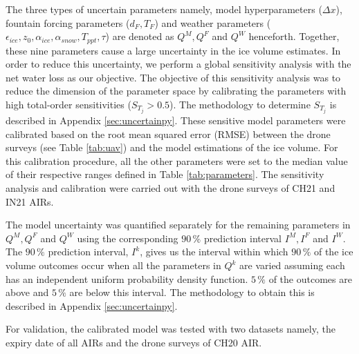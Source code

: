\documentclass[utf8]{frontiersSCNS}
\begin{document}
The three types of uncertain parameters namely, model hyperparameters ($\Delta x$), fountain forcing parameters
($d_F, T_F$) and weather parameters ($\epsilon_{ice}, z_0, \alpha_{ice}, \alpha_{snow}, T_{ppt}, \tau$) are
denoted as $Q^M, Q^F$ and $Q^W$ henceforth. Together, these nine parameters cause a large uncertainty in the ice
volume estimates. In order to reduce this uncertainty, we perform a global sensitivity analysis with the net
water loss as our objective. The objective of this sensitivity analysis was to reduce the dimension of the
parameter space by calibrating the parameters with high total-order sensitivities ($S_{T_{j}} > 0.5$). The
methodology to determine $S_{T_{j}}$ is described in Appendix \ref{sec:uncertainpy}. These sensitive model
parameters were calibrated based on the root mean squared error (RMSE) between the drone surveys (see Table
\ref{tab:uav}) and the model estimations of the ice volume. For this calibration procedure, all the other
parameters were set to the median value of their respective ranges defined in Table \ref{tab:parameters}.  The
sensitivity analysis and calibration were carried out with the drone surveys of CH21 and IN21 AIRs. 

The model uncertainty was quantified separately for the remaining parameters in $Q^M, Q^F$ and $Q^W$ using the
corresponding $90\, \%$ prediction interval $I^M, I^F$ and $I^W$. The $90\, \%$ prediction interval, $I^k$, gives us the
interval within which $90\,\%$ of the ice volume outcomes occur when all the parameters in $Q^k$ are varied
assuming each has an independent uniform probability density function. $5\,\%$ of the outcomes are above and
$5\,\%$ are below this interval. The methodology to obtain this is described in Appendix \ref{sec:uncertainpy}.

For validation, the calibrated model was tested with two datasets namely, the expiry date of all AIRs and the
drone surveys of CH20 AIR.
\end{document}

